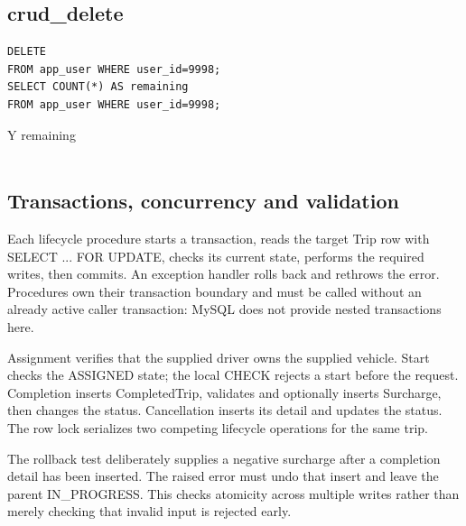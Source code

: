 \documentclass[11pt,a4paper]{article}
\renewcommand{\arraystretch}{1.3}
\begin{document}
\par\noindent\begin{minipage}{\linewidth}\setlength{\parskip}{0pt}\renewcommand{\arraystretch}{1.08}\titlespacing*{\subsection}{0pt}{7pt}{4pt}\lstset{aboveskip=4pt,belowskip=4pt}
\subsection*{crud\_\allowbreak{}delete}
\begin{lstlisting}
DELETE
FROM app_user WHERE user_id=9998;
SELECT COUNT(*) AS remaining
FROM app_user WHERE user_id=9998;
\end{lstlisting}
\par\begingroup\small\noindent
\begin{tabularx}{\linewidth}{Y}
\toprule
remaining\\\\
\bottomrule
\end{tabularx}
\par\endgroup
\end{minipage}\par\vspace{5pt}

\subsection{Transactions, concurrency and validation}
Each lifecycle procedure starts a transaction, reads the target Trip row with SELECT ... FOR UPDATE, checks its current state, performs the required writes, then commits. An exception handler rolls back and rethrows the error. Procedures own their transaction boundary and must be called without an already active caller transaction: MySQL does not provide nested transactions here.

Assignment verifies that the supplied driver owns the supplied vehicle. Start checks the ASSIGNED state; the local CHECK rejects a start before the request. Completion inserts CompletedTrip, validates and optionally inserts Surcharge, then changes the status. Cancellation inserts its detail and updates the status. The row lock serializes two competing lifecycle operations for the same trip.

The rollback test deliberately supplies a negative surcharge after a completion detail has been inserted. The raised error must undo that insert and leave the parent IN\_\allowbreak{}PROGRESS. This checks atomicity across multiple writes rather than merely checking that invalid input is rejected early.
\end{document}
